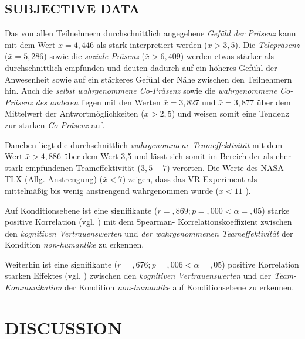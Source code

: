 \documentclass[sigchi]{acmart}
\begin{document}
\subsection{SUBJECTIVE DATA}


Das von allen Teilnehmern durchschnittlich angegebene \textit{Gefühl der Präsenz} kann mit dem Wert $\bar{x} = 4,446$ als stark interpretiert werden ($\bar{x} > 3,5$). Die \textit{Telepräsenz} ($\bar{x} = 5,286$) sowie die \textit{soziale Präsenz} ($\bar{x} > 6,409$) werden etwas stärker als durchschnittlich empfunden und deuten dadurch auf ein höheres Gefühl der Anwesenheit sowie auf ein stärkeres Gefühl der Nähe zwischen den Teilnehmern hin. Auch die \textit{selbst wahrgenommene Co-Präsenz} sowie die \textit{wahrgenommene Co-Präsenz des anderen} liegen mit den Werten $\bar{x} = 3,827$ und $\bar{x} = 3,877$ über dem Mittelwert der Antwortmöglichkeiten ($\bar{x} > 2,5$) und weisen somit eine Tendenz zur starken \textit{Co-Präsenz} auf.

Daneben liegt die durchschnittlich \textit{wahrgenommene Teameffektivität} mit dem Wert $\bar{x} > 4,886$ über dem Wert 3,5 und lässt sich somit im Bereich der als eher stark empfundenen Teameffektivität ($3,5 - 7$) verorten.
Die Werte des NASA-TLX (Allg. Anstrengung) ($\bar{x} < 7$) zeigen, dass das VR Experiment als mittelmäßig bis wenig anstrengend wahrgenommen wurde ($\bar{x} < 11$ ).

Auf Konditionsebene ist eine signifikante ($r =,869; p =,000 < \alpha = ,05$) starke positive Korrelation (vgl. \citep{cohen2013statistical}) mit dem Spearman- Korrelationskoeffizient  zwischen den \textit{kognitiven Vertrauenswerten} und \textit{der wahrgenommenen Teameffektivität} der Kondition \textit{non-humanlike} zu erkennen.

Weiterhin ist eine signifikante ($r =,676; p =,006 < \alpha = ,05$) positive Korrelation starken Effektes (vgl. \citep{cohen2013statistical}) zwischen den \textit{kognitiven Vertrauenswerten} und der \textit{Team-Kommunikation} der Kondition \textit{non-humanlike} auf Konditionsebene zu erkennen.

\section{DISCUSSION}
\end{document}
